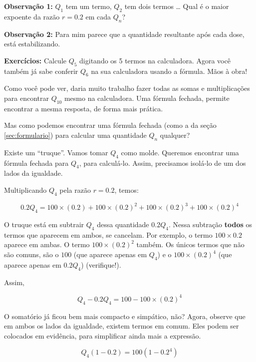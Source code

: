 \documentclass[a4paper]{article}
\begin{document}
{\bf Observação 1:} $Q_1$ tem um termo, $Q_2$ tem dois termos \ldots
Qual é o maior expoente da razão $r=0.2$ em cada $Q_n$?

{\bf Observação 2:} Para mim parece que a quantidade resultante após
cada dose, está estabilizando.%

\hrulefill

{\bf Exercícios:} Calcule $Q_5$ digitando os 5 termos na
calculadora. Agora você também já sabe conferir $Q_6$ na sua
calculadora usando a fórmula. Mãos à obra!

\hrulefill

Como você pode ver, daria muito trabalho fazer todas as somas e
multiplicações para encontrar $Q_{10}$ mesmo na calculadora. Uma
fórmula fechada, permite encontrar a mesma resposta, de forma mais
prática.

Mas como podemos encontrar uma fórmula fechada (como a da seção
\ref{sec:formulario}) para calcular uma quantidade $Q_n$ qualquer?

Existe um ``truque''. Vamos tomar $Q_4$ como molde. Queremos encontrar
uma fórmula fechada para $Q_4$, para calculá-lo. Assim, precisamos
isolá-lo de um dos lados da igualdade.

Multiplicando $Q_4$ pela razão $r=0.2$, temos:

\begin{displaymath}
  0.2Q_4 = 100\times (0.2)+100\times (0.2)^2+100\times (0.2)^3+100\times (0.2)^4
\end{displaymath}

O truque está em subtrair $Q_4$ dessa quantidade $0.2Q_4$. Nessa
subtração {\bf todos} os termos que aparecem em ambos, se
cancelam. Por exemplo, o termo $100\times 0.2$ aparece em ambas. O
termo $100\times (0.2)^2$ também. Os únicos termos que não são comuns,
são o $100$ (que aparece apenas em $Q_4$) e o $100\times (0.2)^4$ (que
aparece apenas em $0.2Q_4$) (verifique!).

Assim,

\begin{displaymath}
  Q_4 - 0.2Q_4 = 100 - 100\times (0.2)^4
\end{displaymath}

O somatório já ficou bem mais compacto e simpático, não? Agora,
observe que em ambos os lados da igualdade, existem termos em
comum. Eles podem ser colocados em evidência, para simplificar ainda
mais a expressão.

\begin{displaymath}
  Q_4(1-0.2) = 100(1-0.2^4)
\end{displaymath}
\end{document}
